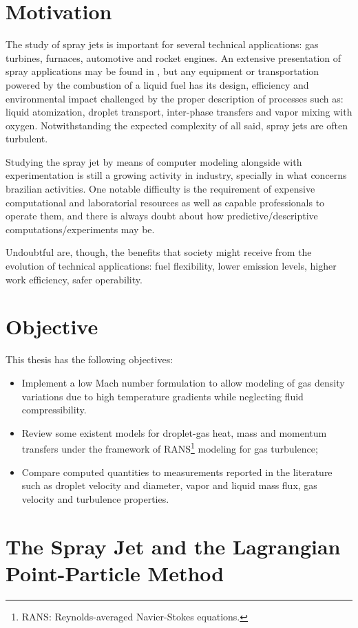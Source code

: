 \section{Motivation}

The study of spray jets is important for several technical applications: gas turbines, furnaces, automotive and rocket engines.  An extensive presentation of spray applications may be found in \cite{liu2000science}, but any equipment or transportation powered by the combustion of a liquid fuel has its design, efficiency and environmental impact challenged by the proper description of processes such as: liquid atomization, droplet transport, inter-phase transfers and vapor mixing with oxygen. Notwithstanding the expected complexity of all said, spray jets are often turbulent. 

Studying the spray jet by means of computer modeling alongside with experimentation is still a growing activity in industry, specially in what concerns brazilian activities. One notable difficulty is the requirement of expensive computational and laboratorial resources as well as capable professionals to operate them, and there is always doubt about how predictive/descriptive computations/experiments may be.

Undoubtful are, though, the benefits that society might receive from the evolution of technical applications: fuel flexibility, lower emission levels, higher work efficiency, safer operability.

\section{Objective}
This thesis has the following objectives:
\begin{itemize}
  \item Implement a low Mach number formulation to allow modeling of gas density variations due to high temperature gradients while neglecting fluid compressibility.
  \item Review some existent models for droplet-gas heat, mass and momentum transfers under the framework of RANS\footnote{RANS: Reynolds-averaged Navier-Stokes equations.} modeling for gas turbulence;
  \item Compare computed quantities to measurements reported in the literature such as droplet velocity and diameter, vapor and liquid mass flux, gas velocity and turbulence properties.
\end{itemize}

\section{The Spray Jet and the Lagrangian Point-Particle Method}

